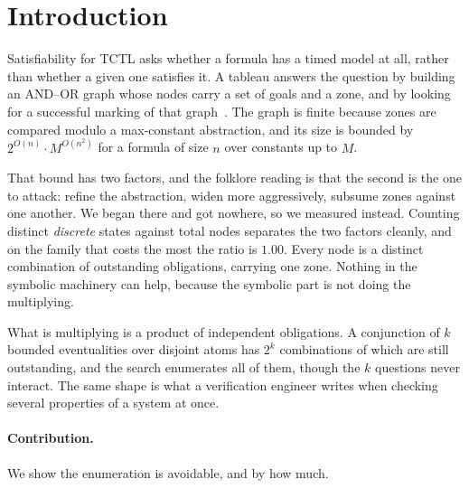 \section{Introduction}
\label{sec:intro}

Satisfiability for TCTL asks whether a formula has a timed model at all, rather
than whether a given one satisfies it. A tableau answers the question by
building an AND--OR graph whose nodes carry a set of goals and a zone, and by
looking for a successful marking of that graph~\cite{Clarke99,tableau_ctl}. The
graph is finite because zones are compared modulo a max-constant abstraction,
and its size is bounded by $2^{O(n)}\cdot M^{O(n^{2})}$ for a formula of size
$n$ over constants up to $M$.

That bound has two factors, and the folklore reading is that the second is the
one to attack: refine the abstraction, widen more aggressively, subsume zones
against one another. We began there and got nowhere, so we measured instead.
Counting distinct \emph{discrete} states against total nodes separates the two
factors cleanly, and on the family that costs the most the ratio is $1.00$.
Every node is a distinct combination of outstanding obligations, carrying one
zone. Nothing in the symbolic machinery can help, because the symbolic part is
not doing the multiplying.

What is multiplying is a product of independent obligations. A conjunction of
$k$ bounded eventualities over disjoint atoms has $2^{k}$ combinations of which
are still outstanding, and the search enumerates all of them, though the $k$
questions never interact. The same shape is what a verification engineer writes
when checking several properties of a system at once.

\paragraph{Contribution.} We show the enumeration is avoidable, and by how
much.

